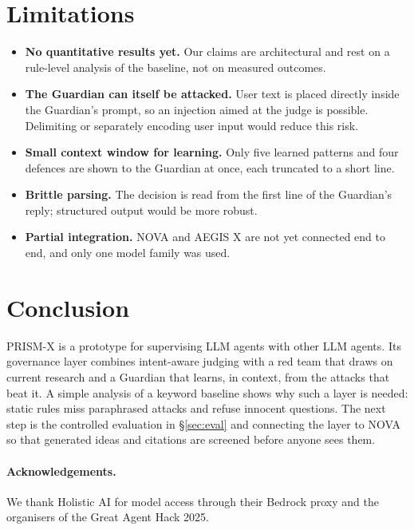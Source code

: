 \documentclass[10pt,twocolumn]{article}
\begin{document}
\section{Limitations}
\begin{itemize}
  \item \textbf{No quantitative results yet.} Our claims are architectural and rest on a rule-level analysis of the baseline, not on measured outcomes.
  \item \textbf{The Guardian can itself be attacked.} User text is placed directly inside the Guardian's prompt, so an injection aimed at the judge is possible. Delimiting or separately encoding user input would reduce this risk.
  \item \textbf{Small context window for learning.} Only five learned patterns and four defences are shown to the Guardian at once, each truncated to a short line.
  \item \textbf{Brittle parsing.} The decision is read from the first line of the Guardian's reply; structured output would be more robust.
  \item \textbf{Partial integration.} NOVA and AEGIS X are not yet connected end to end, and only one model family was used.
\end{itemize}

\section{Conclusion}
PRISM-X is a prototype for supervising LLM agents with other LLM agents. Its governance layer combines intent-aware judging with a red team that draws on current research and a Guardian that learns, in context, from the attacks that beat it. A simple analysis of a keyword baseline shows why such a layer is needed: static rules miss paraphrased attacks and refuse innocent questions. The next step is the controlled evaluation in \S\ref{sec:eval} and connecting the layer to NOVA so that generated ideas and citations are screened before anyone sees them.

\paragraph{Acknowledgements.} We thank Holistic AI for model access through their Bedrock proxy and the organisers of the Great Agent Hack 2025.
\end{document}
